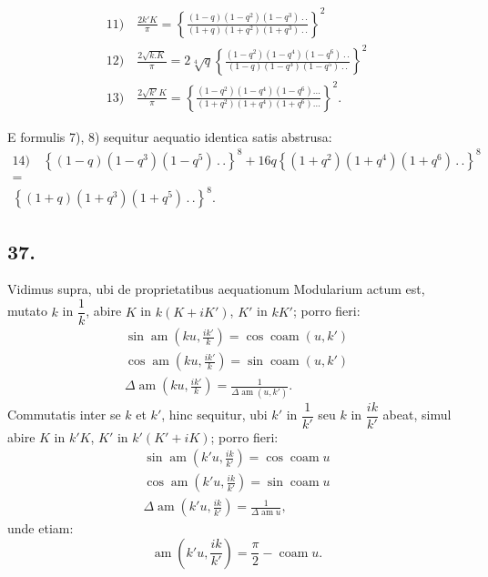\documentclass{article}
\begin{document}
\[
\begin{gathered}
\text{11)}\quad\frac{2k'K}{\pi}=\left\{\frac{(1-q)(1-q^{2})(1-q^{3})\,.\,.}{(1+q)(1+q^{2})(1+q^{3})\,.\,.}\right\}^{2}
\\[2ex]
\text{12)}\quad\frac{2\sqrt{k.K}}{\pi}=2\sqrt[4]{q}\left\{\frac{(1-q^{2})(1-q^{4})(1-q^{6})\,.\,.}{(1-q)(1-q^{3})(1-q^{5})\,.\,.}\right\}^{2}
\\[2ex]
\text{13)}\quad\frac{2\sqrt{k'}K}{\pi}=\left\{\frac{(1-q^{2})(1-q^{4})(1-q^{6})\ldots}{(1+q^{2})(1+q^{4})(1+q^{6})\ldots}\right\}^{2}.
\end{gathered}
\]

E formulis 7), 8) sequitur aequatio identica satis abstrusa:
\[
\begin{gathered}
\text{14)}\quad\left\{(1-q)(1-q^{3})(1-q^{5})\,.\,.\right\}^{8}+16q\left\{(1+q^{2})(1+q^{4})(1+q^{6})\,.\,.\right\}^{8}
\\[1ex]
=
\\[1ex]
\left\{(1+q)(1+q^{3})(1+q^{5})\,.\,.\right\}^{8}.
\end{gathered}
\]

\subsection*{37.}

Vidimus supra, ubi de proprietatibus aequationum Modularium actum est, mutato $k$ in $\dfrac{1}{k}$, abire $K$ in $k(K+iK')$, $K'$ in $kK'$; porro fieri:
\[
\begin{gathered}
\sin\operatorname{am}\left(ku,\frac{ik'}{k}\right)=\cos\operatorname{coam}(u,k')
\\[2ex]
\cos\operatorname{am}\left(ku,\frac{ik'}{k}\right)=\sin\operatorname{coam}(u,k')
\\[2ex]
\Delta\operatorname{am}\left(ku,\frac{ik'}{k}\right)=\frac{1}{\Delta\operatorname{am}(u,k')}.
\end{gathered}
\]
Commutatis inter se $k$ et $k'$, hinc sequitur, ubi $k'$ in $\dfrac{1}{k'}$ seu $k$ in $\dfrac{ik}{k'}$ abeat, simul abire $K$ in $k'K$, $K'$ in $k'(K'+iK)$; porro fieri:
\[
\begin{gathered}
\sin\operatorname{am}\left(k'u,\frac{ik}{k'}\right)=\cos\operatorname{coam}u
\\[2ex]
\cos\operatorname{am}\left(k'u,\frac{ik}{k'}\right)=\sin\operatorname{coam}u
\\[2ex]
\Delta\operatorname{am}\left(k'u,\frac{ik}{k'}\right)=\frac{1}{\Delta\operatorname{am}u},
\end{gathered}
\]
unde etiam:
\[
\operatorname{am}\left(k'u,\frac{ik}{k'}\right)=\frac{\pi}{2}-\operatorname{coam}u.
\]
\end{document}
